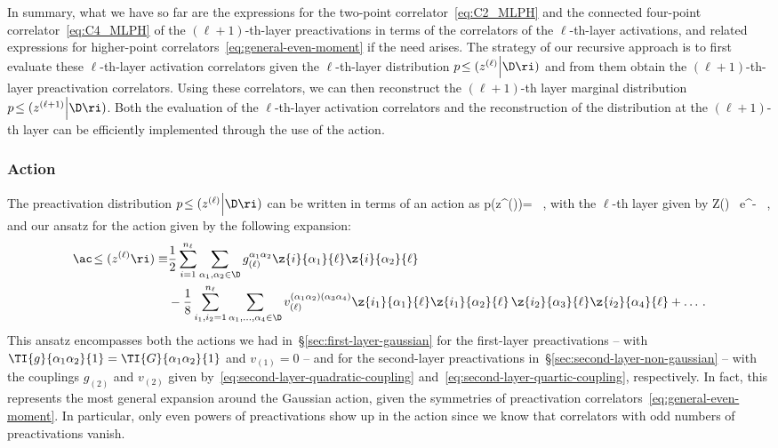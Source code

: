 In summary, what we have so far are the expressions for the two-point correlator~\eqref{eq:C2_MLPH} and the connected four-point correlator~\eqref{eq:C4_MLPH} of the $(\ell+1)$-th-layer preactivations in terms of the correlators of the $\ell$-th-layer activations, and related expressions for higher-point correlators~\eqref{eq:general-even-moment} if the need arises. The strategy of our recursive approach is to first evaluate these $\ell$-th-layer activation correlators given the $\ell$-th-layer distribution $p\!\le(z^{(\ell)}\Big\vert\D\ri)$ and from them obtain the $(\ell+1)$-th-layer preactivation correlators. 
Using these correlators, we can then reconstruct the $(\ell+1)$-th layer marginal distribution $p\!\le(z^{(\ell+1)}\Big\vert\D\ri)$. %
Both the evaluation of the $\ell$-th-layer activation correlators and the reconstruction of the distribution at the $(\ell+1)$-th layer can be efficiently implemented through the use of the action.



\subsubsection{Action}
The preactivation distribution $p\!\le(z^{(\ell)}\Big\vert\D\ri)$ can be written in terms of an action as
\be\label{eq:marginal-distribution-action-ansatz}
p\!\le(z^{(\ell)}\Big\vert\D\ri)= \, ,
\ee
with the $\ell$-th layer  given by
\be\label{eq:chapter-ngp-partition-function}
Z(\ell) \equiv \int {} \, e^{-\EFT{\ell}} \, ,
\ee
and our ansatz for the action given by the following expansion:
\begin{align}\label{eq:general-ell-action}
\ac\!\le(z^{(\ell)}\ri)
\equiv&\frac{1}{2}\sum_{i=1}^{n_{\ell}}\sum_{\alpha_1,\alpha_2\in\D} g^{\alpha_1\alpha_2}_{(\ell)} \z{i}{\alpha_1}{\ell}\z{i}{\alpha_2}{\ell}\, \\
&-\frac{1}{8}\sum_{i_1,i_2=1}^{n_{\ell}}\sum_{\alpha_1,\ldots,\alpha_4\in\D}v^{(\alpha_1\alpha_2)(\alpha_3\alpha_4)}_{(\ell)} \z{i_1}{\alpha_1}{\ell}\z{i_1}{\alpha_2}{\ell}\, \z{i_2}{\alpha_3}{\ell}\z{i_2}{\alpha_4}{\ell}+\ldots\, .\nonumber%
\end{align}
This ansatz encompasses both the actions we had in~\S\ref{sec:first-layer-gaussian} for the first-layer preactivations -- with $\TI{g}{\alpha_1\alpha_2}{1}=\TI{G}{\alpha_1\alpha_2}{1}$ and $v_{(1)}=0$ -- and for the second-layer preactivations in~\S\ref{sec:second-layer-non-gaussian} -- with the couplings $g_{(2)}$ and $v_{(2)}$ given by~\eqref{eq:second-layer-quadratic-coupling} and~\eqref{eq:second-layer-quartic-coupling}, respectively. In fact, this represents the most general expansion around the Gaussian action, given the symmetries of preactivation correlators~\eqref{eq:general-even-moment}. In particular, only even powers of preactivations show up in the action since we know that correlators with odd numbers of preactivations vanish.


